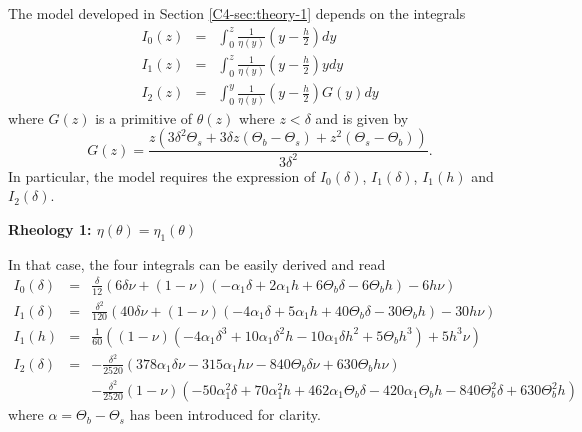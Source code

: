 The model  developed in  Section \ref{C4-sec:theory-1} depends  on the
integrals
\begin{eqnarray}
  I_0(z)&=&\int_0^z\frac{1}{\eta(y)}\left(y-\frac{h}{2}\right)
            dy \\
  I_1(z) &=& \int_0^z\frac{1}{\eta(y)}\left(y-\frac{h}{2}\right)y dy\\
  I_2(z)&=&\int_0^y                         \frac{1}{\eta(y)}
            \left(y-\frac{h}{2}\right)G(y)dy
\end{eqnarray}
where $G(z)$  is a  primitive of $\theta(z)$  where $z<\delta$  and is
given by
\begin{equation}
  G(z) = \frac{z \left(3 \delta ^2 \Theta_s+3 \delta z (\Theta_b-\Theta_s)+z^2 (\Theta_s-\Theta_b)\right)}{3 \delta ^2}.
\end{equation}
In  particular, the  model requires  the expression  of $I_0(\delta)$,
$I_1(\delta)$, $I_1(h)$ and $I_2(\delta)$.

\vspace{.5cm}   \textbf{Rheology   1:   $\eta(\theta)=\eta_1(\theta)$}
\vspace{.5cm}

In that case, the four integrals can be easily derived and read
\begin{eqnarray}
  I_0(\delta)&=&\frac{\delta}{12} \left(6 \delta \nu + (1-\nu) \left(- \alpha_1 \delta + 2 \alpha_1 h + 6 \Theta_{b} \delta - 6 \Theta_{b} h\right) - 6 h \nu\right)\nonumber\\
  I_1(\delta)&=&\frac{\delta^{2}}{120} \left(40 \delta \nu + (1-\nu) \left(- 4 \alpha_1 \delta + 5 \alpha_1 h + 40 \Theta_{b} \delta - 30 \Theta_{b} h\right) - 30 h \nu\right)\nonumber\\
  I_1(h)&=&\frac{1}{60} \left((1-\nu) \left(- 4 \alpha_1 \delta^{3} + 10 \alpha_1 \delta^{2} h - 10 \alpha_1 \delta h^{2} + 5 \Theta_{b} h^{3}\right) + 5 h^{3} \nu\right)\nonumber\\
  I_2(\delta)&=&- \frac{\delta^{2}}{2520} \left(378  \alpha_1 \delta \nu -
                 315  \alpha_1 h  \nu -  840 \Theta_{b}  \delta \nu  + 630
                 \Theta_{b} h \nu \right)\nonumber\\
             &&-\frac{\delta^{2}}{2520}(1-\nu)  \left(- 50  \alpha_1^{2} \delta  + 70
                \alpha_1^{2}  h  +  462  \alpha_1   \Theta_{b}  \delta  -  420  \alpha_1
                \Theta_{b}  h -  840  \Theta_{b}^{2} \delta  + 630  \Theta_{b}^{2}
                h\right)\nonumber
\end{eqnarray}
where $\alpha=\Theta_b-\Theta_s$ has been introduced for clarity.

